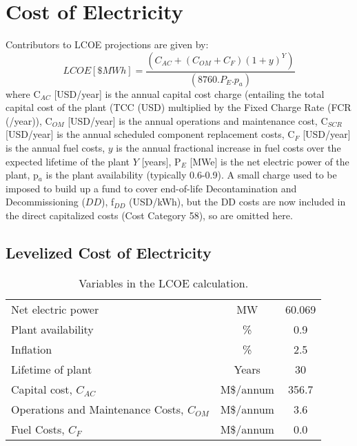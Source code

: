 \newpage 

\section{Cost of Electricity} 

 Contributors to LCOE projections are given by: 
 \begin{equation} 
 LCOE [\$ MWh] = \frac{(C_{AC} + (C_{OM} + C_{F})(1+y)^Y)}{(8760.P_E.p_a)} 
 \label{eq:coe}
\end{equation} 
where C$_{AC}$ [USD/year] is the annual capital cost charge (entailing the total capital cost of the plant (TCC (USD) multiplied by the Fixed Charge Rate (FCR (/year)), C$_{OM}$ [USD/year] is the annual operations and maintenance cost, C$_{SCR}$ [USD/year] is the annual scheduled component replacement costs, C$_{F}$ [USD/year] is the annual fuel costs, $y$ is the annual fractional increase in fuel costs over the expected lifetime of the plant $Y$ [years], P$_{E}$ [MWe] is the net electric power of the plant, p$_{a}$ is the plant availability (typically 0.6-0.9).  A small charge used to be imposed to build up a fund to cover end-of-life Decontamination and Decommissioning ($DD$), f$_{DD}$ (USD/kWh), but the DD costs are now included in the direct capitalized costs (Cost Category 58), so are omitted here.






\subsection{Levelized Cost of Electricity} 

\begin{table}[h!] 
\begin{tabular}{l c c } 
Net electric power & MW & 60.069 \\
Plant availability & \% & 0.9 \\
Inflation & \% & 2.5 \\
Lifetime of plant & Years & 30 \\
Capital cost, $C_{AC}$ &     M\$/annum    &    356.7      \\ 
Operations and Maintenance Costs, $C_{OM}$ & M\$/annum  &      3.6 \\ 
Fuel Costs, $C_{F}$ & M\$/annum  &       0.0 \\ 
    \end{tabular} 
    \caption{Variables in the LCOE calculation.}
    \label{tab:lcoe} 
\end{table} 

